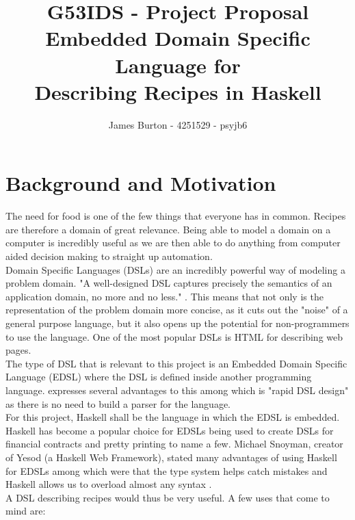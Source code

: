 \documentclass[12pt]{article}
\title
{ 
    G53IDS - Project Proposal \\
    \hfill \break
    \large Embedded Domain Specific Language for \\
    Describing Recipes in Haskell
}
\author{James Burton - 4251529 - psyjb6}
\begin{document}
    \maketitle

    \section{Background and Motivation}

    The need for food is one of the few things that everyone has in
    common. Recipes are therefore a domain of great relevance. Being able
    to model a domain on a computer is incredibly useful as we are then
    able to do anything from computer aided decision making to straight
    up automation. \\

    
    Domain Specific Languages (DSLs) are an incredibly powerful way of
    modeling a problem domain. "A well-designed DSL captures precisely
    the semantics of an application domain, no more and no less." \cite{hudak}.
    This means that not only is the representation of the problem domain
    more concise, as it cuts out the "noise" of a general purpose language,
    but it also opens up the potential for non-programmers to use the
    language. One of the most popular DSLs is HTML for describing
    web pages. \\
    
    
    The type of DSL that is relevant to this project is an Embedded
    Domain Specific Language (EDSL) where the DSL is defined inside
    another programming language. \cite{hudak} expresses several advantages to
    this among which is "rapid DSL design" as there is no need to
    build a parser for the language. \\


    For this project, Haskell shall be the language in which the EDSL is
    embedded. Haskell has become a popular choice for EDSLs being used
    to create DSLs for financial contracts \cite{contracts} and pretty
    printing \cite{pretty} to name a few. Michael Snoyman, creator of
    Yesod (a Haskell Web Framework), stated many advantages of using
    Haskell for EDSLs among which were that the type system helps catch
    mistakes and Haskell allows us to overload almost any syntax
    \cite{snoyman}. \\

    A DSL describing recipes would thus be very useful. A few uses that
    come to mind are:
\end{document}
